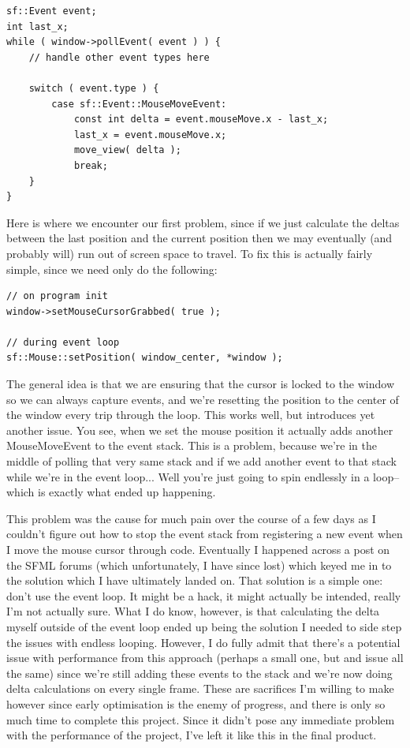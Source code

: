 \documentclass{article}
\begin{document}
\begin{verbatim}
sf::Event event;
int last_x;
while ( window->pollEvent( event ) ) {
    // handle other event types here

    switch ( event.type ) {
        case sf::Event::MouseMoveEvent:
            const int delta = event.mouseMove.x - last_x;
            last_x = event.mouseMove.x;
            move_view( delta );
            break;
    }
}
\end{verbatim}

Here is where we encounter our first problem, since if we just calculate the
deltas between the last position and the current position then we may eventually
(and probably will) run out of screen space to travel. To fix this is actually
fairly simple, since we need only do the following:

\begin{verbatim}
// on program init
window->setMouseCursorGrabbed( true );

// during event loop
sf::Mouse::setPosition( window_center, *window );
\end{verbatim}

The general idea is that we are ensuring that the cursor is locked to the window
so we can always capture events, and we're resetting the position to the center
of the window every trip through the loop. This works well, but introduces yet
another issue. You see, when we set the mouse position it actually adds another
MouseMoveEvent to the event stack. This is a problem, because we're in the
middle of polling that very same stack and if we add another event to that stack
while we're in the event loop... Well you're just going to spin endlessly in a
loop--which is exactly what ended up happening.

This problem was the cause for much pain over the course of a few days as I
couldn't figure out how to stop the event stack from registering a new event
when I move the mouse cursor through code. Eventually I happened across a post
on the SFML forums (which unfortunately, I have since lost) which keyed me in to
the solution which I have ultimately landed on. That solution is a simple one:
don't use the event loop. It might be a hack, it might actually be intended,
really I'm not actually sure. What I do know, however, is that calculating the
delta myself outside of the event loop ended up being the solution I needed to
side step the issues with endless looping. However, I do fully admit that
there's a potential issue with performance from this approach (perhaps a small
one, but and issue all the same) since we're still adding these events to the
stack and we're now doing delta calculations on every single frame. These are
sacrifices I'm willing to make however since early optimisation is the enemy of
progress, and there is only so much time to complete this project. Since it
didn't pose any immediate problem with the performance of the project, I've
left it like this in the final product.
\end{document}
